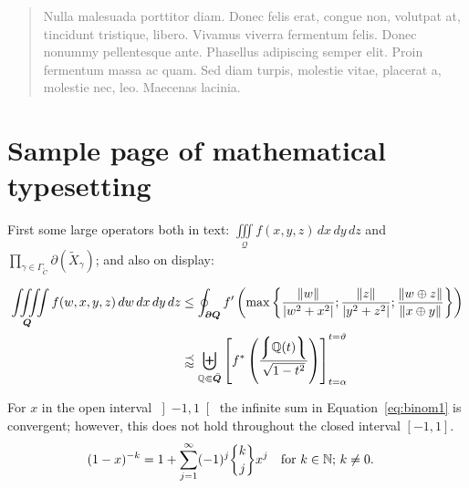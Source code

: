 \begin{quote}
\textcolor{gray}{\textsf{Nulla malesuada porttitor diam. Donec felis erat, congue non, volutpat at, tincidunt tristique, libero. Vivamus viverra fermentum felis. Donec nonummy pellentesque ante. Phasellus adipiscing semper elit. Proin fermentum massa ac quam. Sed diam turpis, molestie vitae, placerat a, molestie nec, leo. Maecenas lacinia.}}
\end{quote}



\newpage


\section{Sample page of mathematical typesetting}

First some large operators
both in text: \( \iiint\limits_{\mathcal{Q}}
f(x,y,z)\,dx\,dy\,dz \) and
\(\prod_{\gamma\in\Gamma_{\widetilde{C}}}
\partial(\widetilde{X}_\gamma)\); and also on display:

\begin{equation}
\begin{split}
\iiiint\limits_{\bm{Q}} f(w,x,y,z)\,dw\,dx\,dy\,dz  &\leq
\oint_{\bm{\partial Q}} f' \left( \max \left\lbrace
\frac{\lVert w \rVert}{\lvert w^2 + x^2 \rvert} ;
\frac{\lVert z \rVert}{\lvert y^2 + z^2 \rvert} ;
\frac{\lVert w \oplus z \rVert}{\lVert x \oplus y \rVert}
\right\rbrace\right)
\\
&\precapprox \biguplus_{\mathbb{Q} \Subset \bar{\bm{Q}}}
\left[ f^{\ast} \left(
    \frac{\left\lmoustache\mathbb{Q}(t)\right\rmoustache}
         {\sqrt {1 - t^2}}
    \right)\right]_{t=\alpha}^{t=\vartheta}
\end{split}
\end{equation}

For $x$ in the open interval \( \left] -1, 1 \right[ \)
the infinite sum in Equation~\eqref{eq:binom1} is convergent;
however, this does not hold
throughout the closed interval \( \left[ -1, 1 \right] \).
\begin{align}
  (1 - x)^{-k} &=
    1 + \sum_{j=1}^{\infty} (-1)^j \genfrac\lbrace\rbrace{0pt}{}{k}{j} x^j
    \text{\quad for $k \in \mathbb{N}$; $k \neq 0$.}
    \label{eq:binom1}
\end{align}


